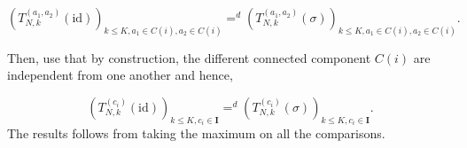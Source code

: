 \documentclass{article}
\theoremstyle{plain}
\theoremstyle{remark}
\newcommand{\1}{\mathbbm{1}}
\newcommand{\id}{\mathrm{id}}
\numberwithin{equation}{section}
\begin{document}
$$(T_{N,k}^{(a_1,a_2)}(\id))_{ k\le K, a_1 \in C(i), a_2 \in C(i)}=^d(T_{N,k}^{(a_1,a_2)}(\sigma))_{ k\le K, a_1 \in C(i), a_2 \in C(i)}.$$

Then, use that by construction, the different connected component $C(i)$ are independent from one another and hence, 

$$(T_{N,k}^{(c_i)}(\id))_{ k\le K, c_i \in \textbf{I}}=^d(T_{N,k}^{(c_i)}(\sigma))_{ k\le K,  c_i \in \textbf{I}}.$$
The results follows from taking the maximum on all the comparisons.



\end{document}
